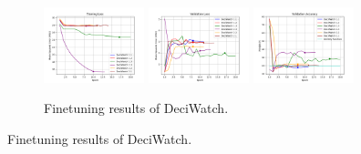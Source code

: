 \documentclass{beamer}
\begin{document}
\begin{frame}
\begin{figure}[htbp]
        \begin{subfigure}[b]{\textwidth}
            \centering
            \includegraphics[width=0.32\textwidth]{../report/entities/finetuned/deciwatch/train_losses.png}
            \includegraphics[width=0.32\textwidth]{../report/entities/finetuned/deciwatch/val_losses.png}
            \includegraphics[width=0.32\textwidth]{../report/entities/finetuned/deciwatch/val_accs.png}
            \caption{Finetuning results of DeciWatch.}
        \end{subfigure}
       \hfill
    \end{figure}
\end{frame}
\end{document}
